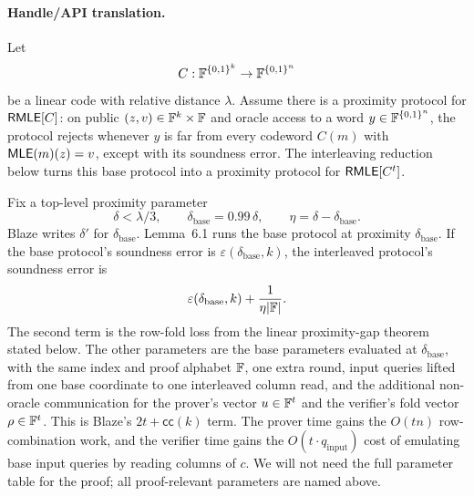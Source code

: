 \paragraph{Handle/API translation.}
\begin{lemma}
\label{lem:blaze-interleaving-handle}
Let
\[
  C:\mathbb{F}^{\{0,1\}^k}\to\mathbb{F}^{\{0,1\}^n}
\]
be a linear code with relative distance \(\lambda\).  Assume there is a
proximity protocol for \(\mathsf{RMLE}[C]\): on public \((z,v)\in\mathbb{F}^k\times\mathbb{F}\) and
oracle access to a word \(y\in\mathbb{F}^{\{0,1\}^n}\), the protocol rejects whenever \(y\)
is far from every codeword \(C(m)\) with \(\mathsf{MLE}(m)(z)=v\), except with its
soundness error.  The interleaving reduction below turns this base protocol
into a proximity protocol for \(\mathsf{RMLE}[C^t]\).

Fix a top-level proximity parameter
\[
  \delta<\lambda/3,
  \qquad
  \delta_{\mathrm{base}}=0.99\,\delta,
  \qquad
  \eta=\delta-\delta_{\mathrm{base}}.
\]
Blaze writes \(\delta'\) for \(\delta_{\mathrm{base}}\).  Lemma~6.1 runs the
base protocol at proximity \(\delta_{\mathrm{base}}\).  If the base protocol's
soundness error is \(\varepsilon(\delta_{\mathrm{base}},k)\), the interleaved
protocol's soundness error is
\[
  \varepsilon(\delta_{\mathrm{base}},k)
  +
  \frac{1}{\eta|\mathbb{F}|}.
\]
The second term is the row-fold loss from the linear proximity-gap theorem
stated below.  The other parameters are the base parameters evaluated at
\(\delta_{\mathrm{base}}\), with the same
index and proof alphabet \(\mathbb{F}\), one extra round, input queries lifted from one
base coordinate to one interleaved column read, and the additional
non-oracle communication for the prover's vector \(u\in\mathbb{F}^t\) and the
verifier's fold vector \(\rho\in\mathbb{F}^t\).  This is Blaze's \(2t+\mathsf{cc}(k)\)
term.  The prover time gains the \(O(tn)\) row-combination work, and the
verifier time gains the \(O(t\cdot q_{\mathrm{input}})\) cost of emulating base
input queries by reading columns of \(c\).  We will not need the full parameter
table for the proof; all proof-relevant parameters are named above.
\end{lemma}

